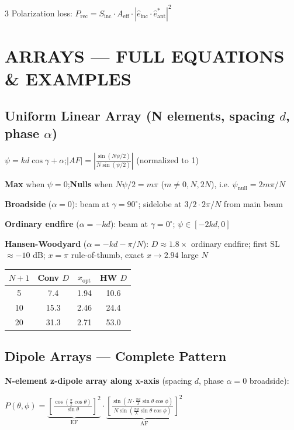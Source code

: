 \documentclass[6pt,landscape]{article}
\begin{document}
\begin{multicols}{3}
Polarization loss: $P_\text{rec}=S_\text{inc}\cdot A_\text{eff}\cdot|\hat{e}_\text{inc}\cdot\hat{e}_\text{ant}^*|^2$

\section*{ARRAYS — FULL EQUATIONS \& EXAMPLES}

\subsection*{Uniform Linear Array (N elements, spacing $d$, phase $\alpha$)}
$\psi=kd\cos\gamma+\alpha$;\quad $|AF|=\left|\frac{\sin(N\psi/2)}{N\sin(\psi/2)}\right|$ (normalized to 1)

\textbf{Max} when $\psi=0$;\quad \textbf{Nulls} when $N\psi/2=m\pi$ ($m\neq0,N,2N$), i.e. $\psi_\text{null}=2m\pi/N$

\textbf{Broadside} ($\alpha=0$): beam at $\gamma=90^\circ$; sidelobe at $3/2\cdot2\pi/N$ from main beam

\textbf{Ordinary endfire} ($\alpha=-kd$): beam at $\gamma=0^\circ$; $\psi\in[-2kd,0]$

\textbf{Hansen-Woodyard} ($\alpha=-kd-\pi/N$): $D\approx1.8\times$ ordinary endfire; first SL$\approx-10$ dB; $x=\pi$ rule-of-thumb, exact $x\to2.94$ large $N$

\begin{center}
\begin{tabular}{cccc}
\toprule
$N+1$ & Conv $D$ & $x_\text{opt}$ & HW $D$\\
\midrule
5 & 7.4 & 1.94 & 10.6\\
10 & 15.3 & 2.46 & 24.4\\
20 & 31.3 & 2.71 & 53.0\\
\bottomrule
\end{tabular}
\end{center}

\subsection*{Dipole Arrays — Complete Pattern}
\textbf{N-element z-dipole array along x-axis} (spacing $d$, phase $\alpha=0$ broadside):

$P(\theta,\phi)=\underbrace{\left[\frac{\cos(\frac{\pi}{2}\cos\theta)}{\sin\theta}\right]^2}_\text{EF}\cdot\underbrace{\left[\frac{\sin(N\cdot\frac{\pi d}{\lambda}\sin\theta\cos\phi)}{N\sin(\frac{\pi d}{\lambda}\sin\theta\cos\phi)}\right]^2}_\text{AF}$


\end{multicols}
\end{document}
